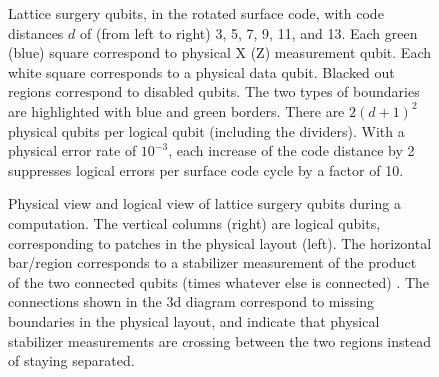 \documentclass[superscriptaddress,notitlepage,longbibliography]{revtex4-1}
\theoremstyle{definition}
\theoremstyle{definition}
\begin{document}
\begin{figure}[ht]
    \label{fig:lattice-surgery-qubit}
    \caption{
        Lattice surgery qubits, in the rotated surface code, with code distances $d$ of (from left to right) 3, 5, 7, 9, 11, and 13.
        Each green (blue) square correspond to physical X (Z) measurement qubit.
        Each white square corresponds to a physical data qubit.
        Blacked out regions correspond to disabled qubits.
        The two types of boundaries are highlighted with blue and green borders.
        There are $2 (d+1)^2$ physical qubits per logical qubit (including the dividers).
        With a physical error rate of $10^{-3}$, each increase of the code distance by 2 suppresses logical errors per surface code cycle by a factor of 10.
    }
\end{figure}


\begin{figure}[ht]
    \label{fig:lattice-surgery-board}
    \caption{
        Physical view and logical view of lattice surgery qubits during a computation.
        The vertical columns (right) are logical qubits, corresponding to patches in the physical layout (left).
        The horizontal bar/region corresponds to a stabilizer measurement of the product of the two connected qubits (times whatever else is connected) \cite{fowler2018}.
        The connections shown in the 3d diagram correspond to missing boundaries in the physical layout, and indicate that physical stabilizer measurements are crossing between the two regions instead of staying separated.
    }
\end{figure}
\end{document}

